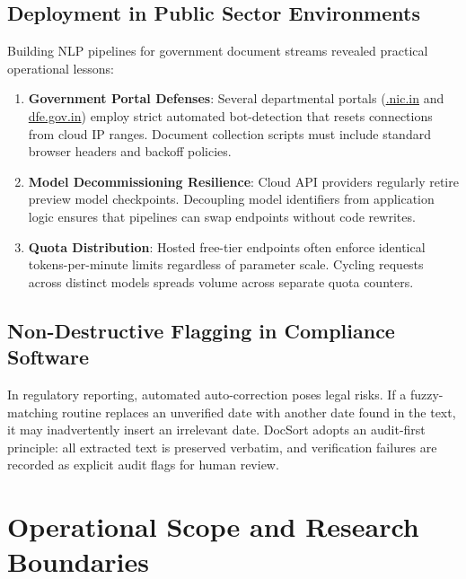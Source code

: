 \documentclass{article}
\begin{document}
\subsection{Deployment in Public Sector Environments}
Building NLP pipelines for government document streams revealed practical operational lessons:
\begin{enumerate}
    \item \textbf{Government Portal Defenses}: Several departmental portals (\url{.nic.in} and \url{dfe.gov.in}) employ strict automated bot-detection that resets connections from cloud IP ranges. Document collection scripts must include standard browser headers and backoff policies.
    \item \textbf{Model Decommissioning Resilience}: Cloud API providers regularly retire preview model checkpoints. Decoupling model identifiers from application logic ensures that pipelines can swap endpoints without code rewrites.
    \item \textbf{Quota Distribution}: Hosted free-tier endpoints often enforce identical tokens-per-minute limits regardless of parameter scale. Cycling requests across distinct models spreads volume across separate quota counters.
\end{enumerate}

\subsection{Non-Destructive Flagging in Compliance Software}
In regulatory reporting, automated auto-correction poses legal risks. If a fuzzy-matching routine replaces an unverified date with another date found in the text, it may inadvertently insert an irrelevant date. DocSort adopts an audit-first principle: all extracted text is preserved verbatim, and verification failures are recorded as explicit audit flags for human review.

\section{Operational Scope and Research Boundaries}
\end{document}
